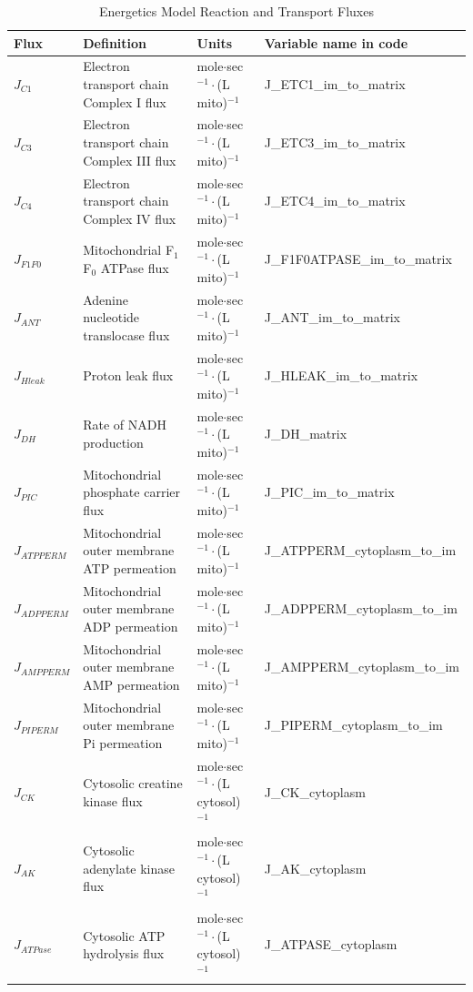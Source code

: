 \documentclass[fleqn,10pt]{physiome}
\begin{document}
\begin{table}[ht]\centering
\small
\caption{Energetics Model Reaction and Transport Fluxes}\label{tab:2}
\begin{supertabular}{l p{3.0cm} l l}
\toprule
Flux & Definition & Units & Variable name in code \\
\midrule
$J_{C1}$  & Electron transport chain Complex I flux   & 
    mole$\cdot$sec$^{-1}\cdot$(L mito)$^{-1}$ & J\_ETC1\_im\_to\_matrix \\
$J_{C3}$  & Electron transport chain Complex III flux & 
    mole$\cdot$sec$^{-1}\cdot$(L mito)$^{-1}$ & J\_ETC3\_im\_to\_matrix \\
$J_{C4}$  & Electron transport chain Complex IV flux  & 
    mole$\cdot$sec$^{-1}\cdot$(L mito)$^{-1}$ & J\_ETC4\_im\_to\_matrix \\

$J_{F1F0}$  & Mitochondrial F$_1$F$_0$ ATPase flux  & 
    mole$\cdot$sec$^{-1}\cdot$(L mito)$^{-1}$ & J\_F1F0ATPASE\_im\_to\_matrix \\
$J_{ANT}$  & Adenine nucleotide translocase flux   & 
    mole$\cdot$sec$^{-1}\cdot$(L mito)$^{-1}$ & J\_ANT\_im\_to\_matrix \\
$J_{Hleak}$  & Proton leak flux   & 
    mole$\cdot$sec$^{-1}\cdot$(L mito)$^{-1}$ & J\_HLEAK\_im\_to\_matrix \\
$J_{DH}$  & Rate of NADH production  & 
    mole$\cdot$sec$^{-1}\cdot$(L mito)$^{-1}$ & J\_DH\_matrix \\
$J_{PIC}$  & Mitochondrial phosphate carrier flux   & 
    mole$\cdot$sec$^{-1}\cdot$(L mito)$^{-1}$ & J\_PIC\_im\_to\_matrix \\

$J_{ATPPERM}$  & Mitochondrial outer membrane ATP permeation  & 
    mole$\cdot$sec$^{-1}\cdot$(L mito)$^{-1}$ & J\_ATPPERM\_cytoplasm\_to\_im \\
$J_{ADPPERM}$  & Mitochondrial outer membrane ADP permeation  & 
    mole$\cdot$sec$^{-1}\cdot$(L mito)$^{-1}$ & J\_ADPPERM\_cytoplasm\_to\_im \\
$J_{AMPPERM}$  & Mitochondrial outer membrane AMP permeation  & 
    mole$\cdot$sec$^{-1}\cdot$(L mito)$^{-1}$ & J\_AMPPERM\_cytoplasm\_to\_im \\
$J_{PIPERM}$  & Mitochondrial outer membrane Pi permeation  & 
    mole$\cdot$sec$^{-1}\cdot$(L mito)$^{-1}$ & J\_PIPERM\_cytoplasm\_to\_im \\

$J_{CK}$  & Cytosolic creatine kinase flux  & 
    mole$\cdot$sec$^{-1}\cdot$(L cytosol)$^{-1}$ & J\_CK\_cytoplasm \\
$J_{AK}$  & Cytosolic adenylate kinase flux  & 
    mole$\cdot$sec$^{-1}\cdot$(L cytosol)$^{-1}$ & J\_AK\_cytoplasm \\
$J_{ATPase}$  & Cytosolic ATP hydrolysis flux  & 
    mole$\cdot$sec$^{-1}\cdot$(L cytosol)$^{-1}$ & J\_ATPASE\_cytoplasm \\

\bottomrule 
\end{supertabular}
\end{table}
\end{document}
